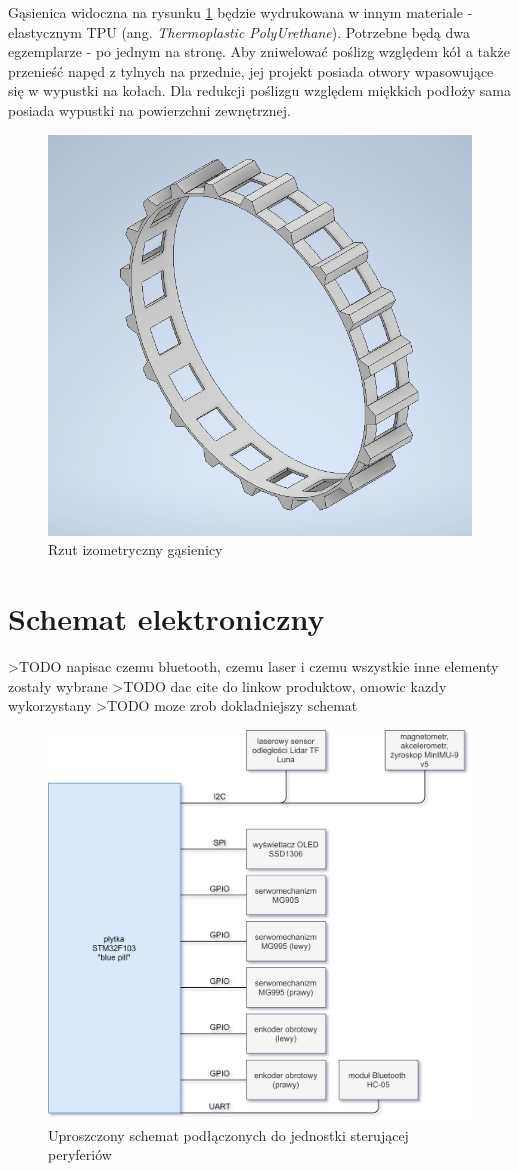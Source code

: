 Gąsienica widoczna na rysunku \ref{fig:tracks} będzie wydrukowana w innym materiale - elastycznym TPU (ang. \emph{Thermoplastic PolyUrethane}). Potrzebne będą dwa egzemplarze - po jednym na stronę. Aby zniwelować poślizg względem kół a także przenieść napęd z tylnych na przednie, jej projekt posiada otwory wpasowujące się w wypustki na kołach. Dla redukcji poślizgu względem miękkich podłoży sama posiada wypustki na powierzchni zewnętrznej.

\begin{figure}[ht]
	\centering
		\includegraphics[width=0.6\linewidth]{rys/tracks-final.png}
	\caption{Rzut izometryczny gąsienicy}
	\label{fig:tracks}
\end{figure}



\section{Schemat elektroniczny}
>TODO napisac czemu bluetooth, czemu laser i czemu wszystkie inne elementy zostały wybrane
>TODO dac cite do linkow produktow, omowic kazdy wykorzystany
>TODO moze zrob dokladniejszy schemat

\begin{figure}[ht]
	\centering
		\includegraphics[width=1\linewidth]{rys/electronic-schematic.png}
	\caption{Uproszczony schemat podłączonych do jednostki sterującej peryferiów}
	\label{fig:electronic-schematic-simplified}
\end{figure}

